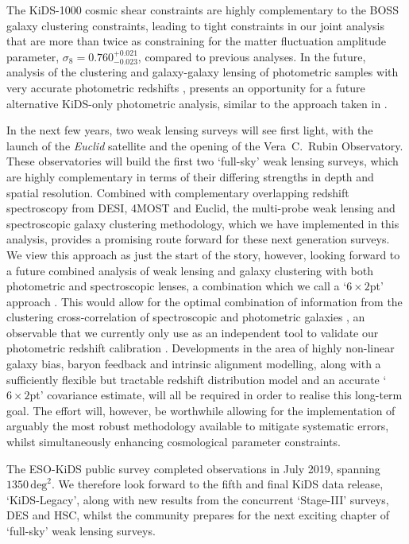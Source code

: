 The KiDS-1000 cosmic shear constraints are highly complementary to the BOSS galaxy clustering constraints, leading to tight constraints in our joint \tttp analysis that are more than twice as constraining for the matter fluctuation amplitude parameter, $\sigma_8 = 0.760^{+0.021}_{-0.023}$, compared to previous \tttp analyses.    In the future, analysis of the clustering and galaxy-galaxy lensing of photometric samples with very accurate photometric redshifts \citep[see for example][]{vakili/etal:2019}, presents an opportunity for a future alternative KiDS-only \tttp photometric analysis, similar to the approach taken in \citet{abbott/etal:2018}.

In the next few years, two weak lensing surveys will see first light, with the launch of the {\it Euclid} satellite and the opening of the Vera~C.~Rubin Observatory.   These observatories will build the first two `full-sky' weak lensing surveys, which are highly complementary in terms of their differing strengths in depth and spatial resolution.  Combined with complementary overlapping redshift spectroscopy from DESI, 4MOST and Euclid, the multi-probe weak lensing and spectroscopic galaxy clustering methodology, which we have implemented in this analysis, provides a promising route forward for these next generation surveys.   We view this \tttp approach as just the start of the story, however, looking forward to a future combined analysis of weak lensing and galaxy clustering with both photometric and spectroscopic lenses, a combination which we call a `$6\times2$pt' approach \citep{bernstein:2009}.    This would allow for the optimal combination of information from the clustering cross-correlation of spectroscopic and photometric galaxies \citep{newman:2008}, an observable that we currently only use as an independent tool to validate our photometric redshift calibration \citep{hildebrandt/etal:inprep}.      Developments in the area of highly non-linear galaxy bias, baryon feedback and intrinsic alignment modelling, along with a sufficiently flexible but tractable redshift distribution model and an accurate `$6\times2$pt' covariance estimate, will all be required in order to realise this long-term goal.   The effort will, however, be worthwhile allowing for the implementation of arguably the most robust methodology available to mitigate systematic errors, whilst simultaneously enhancing cosmological parameter constraints.

The ESO-KiDS public survey completed observations in July 2019, spanning $1350\,\mathrm{deg}^{2}$.   We therefore look forward to the fifth and final KiDS data release, `KiDS-Legacy', along with new results from the concurrent `Stage-III' surveys, DES and HSC, whilst the community prepares for the next exciting chapter of `full-sky' weak lensing surveys.  